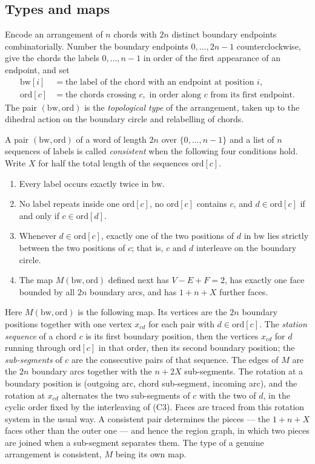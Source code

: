 \documentclass[11pt]{amsart}
\theoremstyle{definition}
\theoremstyle{remark}
\begin{document}
\subsection*{Types and maps}
Encode an arrangement of $n$ chords with $2n$ distinct boundary endpoints
combinatorially. Number the boundary endpoints $0,\ldots,2n-1$ counterclockwise, give the
chords the labels $0,\ldots,n-1$ in order of the first appearance of an endpoint, and set
\begin{align*}
 \mathrm{bw}[i] &= \text{the label of the chord with an endpoint at position } i,\\
 \mathrm{ord}[c] &= \text{the chords crossing } c, \text{ in order along } c
   \text{ from its first endpoint.}
\end{align*}
The pair $(\mathrm{bw},\mathrm{ord})$ is the \emph{topological type} of the arrangement,
taken up to the dihedral action on the boundary circle and relabelling of chords.

A pair $(\mathrm{bw},\mathrm{ord})$ of a word of length $2n$ over $\{0,\ldots,n-1\}$ and a
list of $n$ sequences of labels is called \emph{consistent} when the following four
conditions hold. Write $X$ for half the total length of the sequences $\mathrm{ord}[c]$.
\begin{enumerate}
\item[(C1)] Every label occurs exactly twice in $\mathrm{bw}$.
\item[(C2)] No label repeats inside one $\mathrm{ord}[c]$, no $\mathrm{ord}[c]$ contains
$c$, and $d\in\mathrm{ord}[c]$ if and only if $c\in\mathrm{ord}[d]$.
\item[(C3)] Whenever $d\in\mathrm{ord}[c]$, exactly one of the two positions of $d$ in
$\mathrm{bw}$ lies strictly between the two positions of $c$; that is, $c$ and $d$
interleave on the boundary circle.
\item[(C4)] The map $M(\mathrm{bw},\mathrm{ord})$ defined next has $V-E+F=2$, has exactly
one face bounded by all $2n$ boundary arcs, and has $1+n+X$ further faces.
\end{enumerate}
Here $M(\mathrm{bw},\mathrm{ord})$ is the following map. Its vertices are the $2n$
boundary positions together with one vertex $x_{cd}$ for each pair with
$d\in\mathrm{ord}[c]$. The \emph{station sequence} of a chord $c$ is its first boundary
position, then the vertices $x_{cd}$ for $d$ running through $\mathrm{ord}[c]$ in that
order, then its second boundary position; the \emph{sub-segments} of $c$ are the
consecutive pairs of that sequence. The edges of $M$ are the $2n$ boundary arcs together
with the $n+2X$ sub-segments. The rotation at a boundary position is (outgoing arc, chord
sub-segment, incoming arc), and the rotation at $x_{cd}$ alternates the two sub-segments of
$c$ with the two of $d$, in the cyclic order fixed by the interleaving of (C3). Faces are
traced from this rotation system in the usual way. A consistent pair determines the pieces
--- the $1+n+X$ faces other than the outer one --- and hence the region graph, in which
two pieces are joined when a sub-segment separates them. The type of a genuine
arrangement is consistent, $M$ being its own map.
\end{document}
